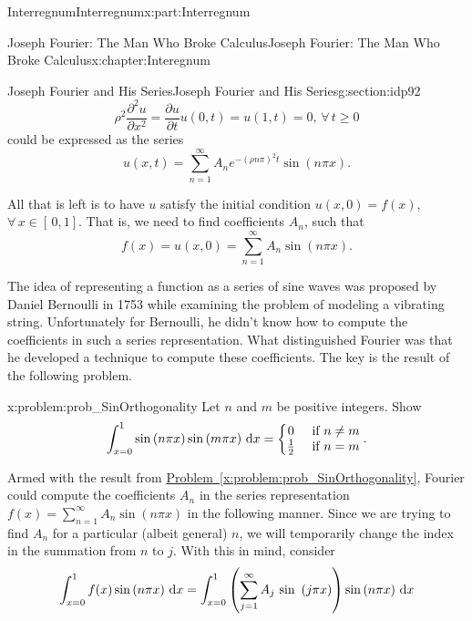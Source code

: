 \begin{partptx}{Interregnum}{}{Interregnum}{}{}{x:part:Interregnum}
\begin{chapterptx}{Joseph Fourier: The Man Who Broke Calculus}{}{Joseph Fourier: The Man Who Broke Calculus}{}{}{x:chapter:Interegnum}
\begin{sectionptx}{Joseph Fourier and His Series}{}{Joseph Fourier and His Series}{}{}{g:section:idp92}
\begin{equation*}
				\rho^2\frac{\partial^2u}{\partial x^2}=\frac{\partial u}{\partial t} u(0,t)=u(1,t)=0, \,\forall\,t\geq 0
			\end{equation*}
			could be expressed as the series%
			\begin{equation*}
				u(x,t)=\sum_{n=1}^\infty A_ne^{-(\rho n\pi)^2t}\sin\left(n\pi x\right)\text{.}
			\end{equation*}
			\par
			All that is left is to have \(u\) satisfy the initial condition \(u(x,0)=f(x)\), \(\forall\,x\in[\,0,1]\). That is, we need to find coefficients \(A_n\), such that%
			\begin{equation*}
				f(x)=u(x,0)=\sum_{n=1}^\infty A_n\sin\left(n\pi x\right)\text{.}
			\end{equation*}
			\par
			The idea of representing a function as a series of sine waves was proposed by Daniel Bernoulli in 1753 while examining the problem of modeling a vibrating string. Unfortunately for Bernoulli, he didn't know how to compute the coefficients in such a series representation. What distinguished Fourier was that he developed a technique to compute these coefficients. The key is the result of the following problem.%
			\begin{problem}{}{x:problem:prob_SinOrthogonality}%
				 Let \(n\) and \(m\) be positive integers. Show%
				\begin{equation*}
					\int_{x=0}^1\sin\left(n\pi x\right)\sin\left(m\pi x\right)\,{\rm d} x= \left\{\begin{matrix}0& \text{ if } n\neq m\\ \frac{1}{2}& \text{ if } n=m \end{matrix} \right.. {}
				\end{equation*}
			\end{problem}
			Armed with the result from \hyperref[x:problem:prob_SinOrthogonality]{Problem~{\xreffont\ref{x:problem:prob_SinOrthogonality}}},  Fourier could compute the coefficients \(A_n\) in the series representation \(f(x)=\sum_{n=1}^\infty A_n \sin\left(n\pi x\right)\) in the following manner. Since we are trying to find \(A_n\) for a particular (albeit general) \(n\), we will temporarily change the index in the summation from \(n\) to \(j\). With this in mind, consider%
			\begin{align*}
				\int_{x=0}^1f(x)\sin\left(n\pi x\right)\dx{ x} \amp =\int_{x=0}^1\left(\sum_{j=1}^\infty A_j\text{ sin } \left(j\pi x\right)\right)\sin\left(n\pi x\right)\dx{ x}\\

\end{align*}
\end{sectionptx}
\end{chapterptx}
\end{partptx}
